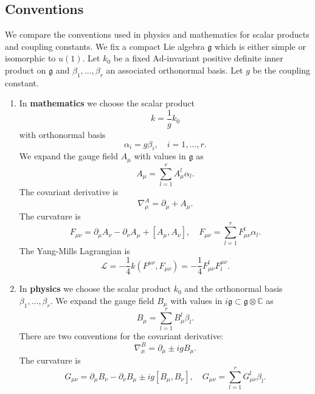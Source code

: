 \documentclass[11pt]{amsart}
\theoremstyle{definition}
\theoremstyle{remark}
\numberwithin{equation}{section}
\begin{document}
\subsection{Conventions} We compare the conventions used in physics and mathematics for scalar products and coupling constants. We fix a compact Lie algebra $\mathfrak{g}$ which is either simple or isomorphic to $u(1)$. Let $k_0$ be a fixed $\mathrm{Ad}$-invariant positive definite inner product on $\mathfrak{g}$ and $\beta_1,\ldots,\beta_r$ an associated orthonormal basis. Let $g$ be the coupling constant.
\begin{enumerate}
\item In {\bf mathematics} we choose the scalar product
\begin{equation*}
k=\frac{1}{g}k_0
\end{equation*}
with orthonormal basis
\begin{equation*}
\alpha_i=g\beta_i,\quad i=1,\ldots,r.
\end{equation*}
We expand the gauge field $A_\mu$ with values in $\mathfrak{g}$ as
\begin{equation*}
A_\mu=\sum_{l=1}^rA_\mu^l\alpha_l.
\end{equation*}
The covariant derivative is
\begin{equation*}
\nabla_\mu^A=\partial_\mu+A_\mu.
\end{equation*}
The curvature is
\begin{equation*}
F_{\mu\nu}=\partial_\mu A_\nu-\partial_\nu A_\mu+[A_\mu,A_\nu],\quad F_{\mu\nu}=\sum_{l=1}^rF_{\mu\nu}^l\alpha_l.
\end{equation*}
The Yang-Mills Lagrangian is
\begin{equation*}
\mathcal{L}=-\frac{1}{4}k(F^{\mu\nu},F_{\mu\nu})=-\frac{1}{4}F_{\mu\nu}^lF^{\mu\nu}_l.
\end{equation*}
\item In {\bf physics} we choose the scalar product $k_0$ and the orthonormal basis $\beta_1,\ldots,\beta_r$. We expand the gauge field $B_\mu$ with values in $i\mathfrak{g}\subset\mathfrak{g}\otimes\mathbb{C}$ as
\begin{equation*}
B_\mu=\sum_{l=1}^rB_\mu^l\beta_l.
\end{equation*}
There are two conventions for the covariant derivative:
\begin{equation*}
\nabla_\mu^B=\partial_\mu\pm igB_\mu.
\end{equation*}
The curvature is
\begin{equation*}
G_{\mu\nu}=\partial_\mu B_\nu-\partial_\nu B_\mu\pm ig[B_\mu,B_\nu],\quad G_{\mu\nu}=\sum_{l=1}^rG_{\mu\nu}^l\beta_l.

\end{equation*}
\end{enumerate}
\end{document}
